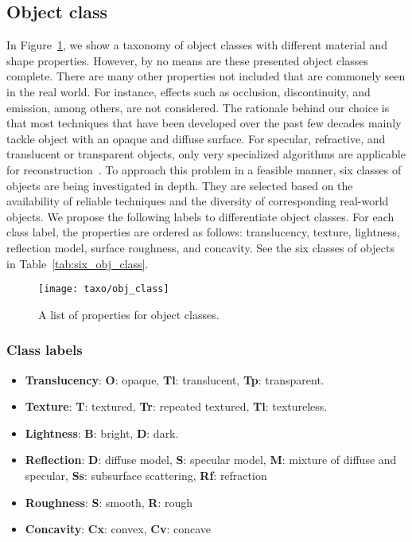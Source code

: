 \subsection{Object class}
In Figure~\ref{fig:obj_class}, we show a taxonomy of object classes with different material and shape properties. However, by no means are these presented object classes complete. There are many other properties not included that are commonely seen in the real world. For instance, effects such as occlusion, discontinuity, and emission, among others, are not considered. The rationale behind our choice is that most techniques that have been developed over the past few decades mainly tackle object with an opaque and diffuse surface. For specular, refractive, and translucent or transparent objects, only very specialized algorithms are applicable for reconstruction~\cite{ihrke2010transparent}. To approach this problem in a feasible manner, six classes of objects are being investigated in depth. They are selected based on the availability of reliable techniques and the diversity of corresponding real-world objects. We propose the following labels to differentiate object classes. For each class label, the properties are ordered as follows: translucency, texture, lightness, reflection model, surface roughness, and concavity. See the six classes of objects in Table~\ref{tab:six_obj_class}.
\begin{figure}[!htbp]
\centering
\texttt{[image: taxo/obj\_class]}\\
\caption{A list of properties for object classes.}
\label{fig:obj_class}
\end{figure}

\subsubsection{Class labels}
\begin{itemize}
\item \textbf{Translucency}: \textbf{O}: opaque, \textbf{Tl}: translucent, \textbf{Tp}: transparent.
\item \textbf{Texture}: \textbf{T}: textured, \textbf{Tr}: repeated textured, \textbf{Tl}: textureless.
\item \textbf{Lightness}: \textbf{B}: bright, \textbf{D}: dark.
\item \textbf{Reflection}: \textbf{D}: diffuse model, \textbf{S}: specular model, \textbf{M}: mixture of diffuse and specular, \textbf{Ss}: subsurface scattering, \textbf{Rf}: refraction
\item \textbf{Roughness}: \textbf{S}: smooth, \textbf{R}: rough
\item \textbf{Concavity}: \textbf{Cx}: convex, \textbf{Cv}: concave
\end{itemize}

